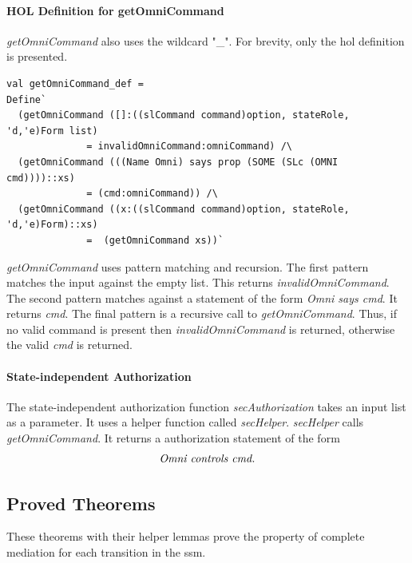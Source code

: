 \documentclass[../../main/main.tex]{subfiles}
\begin{document}
\paragraph*{HOL Definition for getOmniCommand}
\textit{getOmniCommand} also uses the wildcard "_".  For brevity, only the \gls{hol} definition is presented.

\begin{lstlisting}
val getOmniCommand_def =
Define`
  (getOmniCommand ([]:((slCommand command)option, stateRole, 'd,'e)Form list)
  		      = invalidOmniCommand:omniCommand) /\
  (getOmniCommand (((Name Omni) says prop (SOME (SLc (OMNI cmd))))::xs)
  		      = (cmd:omniCommand)) /\
  (getOmniCommand ((x:((slCommand command)option, stateRole, 'd,'e)Form)::xs)
  		      =  (getOmniCommand xs))`
\end{lstlisting}

\textit{getOmniCommand}  uses pattern matching and recursion.  The first pattern matches the input against the empty list.  This returns \textit{invalidOmniCommand}.  The second pattern matches against a statement of the form \textit{Omni says cmd}.  It returns \textit{cmd}.  The final pattern is a recursive call to \textit{getOmniCommand}.  Thus, if no valid command is present then \textit{invalidOmniCommand} is returned, otherwise the valid \textit{cmd} is returned.


\paragraph*{State-independent Authorization}
The state-independent authorization function \textit{secAuthorization} takes an input list as a parameter.  It uses a helper function called \textit{secHelper}.  \textit{secHelper} calls \textit{getOmniCommand}.  It returns a authorization statement of the form 
\[\text{\textit{Omni controls cmd.}}\]


\HOLPBIntegratedDefDefinitionssecAuthorizationXXdef

\HOLDfnTag{PBIntegratedDef}{secHelper_def}\HOLPBIntegratedDefDefinitionssecHelperXXdef


\subsection{Proved Theorems}\label{ssec:ssmpbproved}
These theorems with their helper lemmas prove the property of complete mediation for each transition in the \gls{ssm}.
\end{document}
